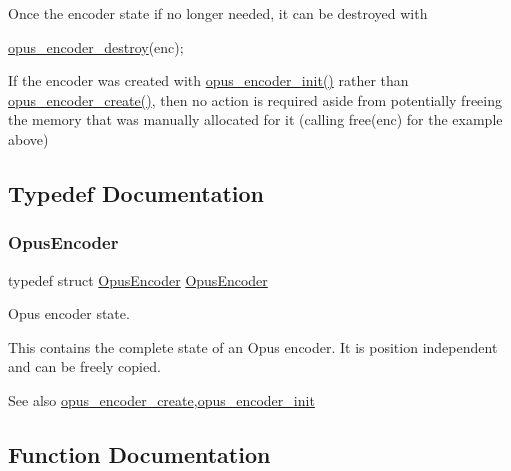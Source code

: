 Once the encoder state if no longer needed, it can be destroyed with


\begin{DoxyCode}
\hyperlink{group__opus__encoder_ga5f4c05b4b51cdffec5a55dbf17bbfa1c}{opus\_encoder\_destroy}(enc);
\end{DoxyCode}


If the encoder was created with \hyperlink{group__opus__encoder_ga515db1c267a7421dacaad3610f79eb79}{opus\+\_\+encoder\+\_\+init()} rather than \hyperlink{group__opus__encoder_gaa89264fd93c9da70362a0c9b96b9ca88}{opus\+\_\+encoder\+\_\+create()}, then no action is required aside from potentially freeing the memory that was manually allocated for it (calling free(enc) for the example above) 

\subsection{Typedef Documentation}
\mbox{\label{group__opus__encoder_gaf461a3ef2f10c2fe8b994a176f06c9bd}} 
\subsubsection{\texorpdfstring{Opus\+Encoder}{OpusEncoder}}
{\footnotesize\ttfamily typedef struct \hyperlink{group__opus__encoder_gaf461a3ef2f10c2fe8b994a176f06c9bd}{Opus\+Encoder} \hyperlink{group__opus__encoder_gaf461a3ef2f10c2fe8b994a176f06c9bd}{Opus\+Encoder}}



Opus encoder state. 

This contains the complete state of an Opus encoder. It is position independent and can be freely copied. \begin{DoxySeeAlso}{See also}
\hyperlink{group__opus__encoder_gaa89264fd93c9da70362a0c9b96b9ca88}{opus\+\_\+encoder\+\_\+create},\hyperlink{group__opus__encoder_ga515db1c267a7421dacaad3610f79eb79}{opus\+\_\+encoder\+\_\+init} 
\end{DoxySeeAlso}


\subsection{Function Documentation}
\mbox{\label{group__opus__encoder_gad2d6bf6a9ffb6674879d7605ed073e25}} 
